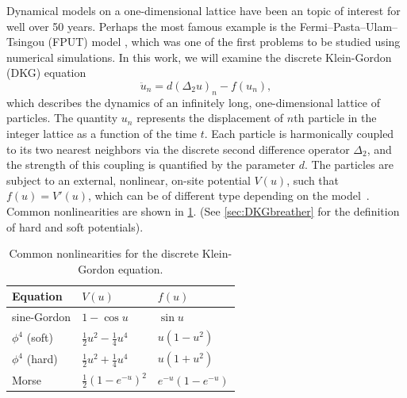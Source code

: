 \documentclass[12pt,reqno]{amsart}
\theoremstyle{definition}
\begin{document}
Dynamical models on a one-dimensional lattice have been an topic of interest for well over 50 years. Perhaps the most famous example is the Fermi–Pasta–Ulam–Tsingou (FPUT) model \cites{FPUT,Zabusuy1965}, which was one of the first problems to be studied using numerical simulations. In this work, we will examine the discrete Klein-Gordon (DKG) equation~\cites{braun2004,SGbook,p4book,kivsharmalomed}
\begin{equation*}
\ddot{u}_n = d (\Delta_2 u)_n - f(u_n),
\end{equation*}
which describes the dynamics of an infinitely long, one-dimensional lattice of particles. The quantity $u_n$ represents the displacement of $n$th particle in the integer lattice as a function of the time $t$. Each particle is harmonically coupled to its two nearest neighbors via the discrete second difference operator $\Delta_2$, and the strength of this coupling is quantified by the parameter $d$. The particles are subject to an external, nonlinear, on-site potential $V(u)$, such that $f(u) = V'(u)$, which can be of different
type depending on the model~\cites{Karachalios,imamat}. Common nonlinearities are shown in \cref{table:V}. (See \cref{sec:DKGbreather} for the definition of hard and soft potentials).

\begin{table}
\begin{tabular}{lll}\toprule
Equation & $V(u)$ & $f(u)$ \\ \midrule
sine-Gordon & $1 - \cos u$ & $\sin u$ \\
$\phi^4$ (soft) & $\frac{1}{2}u^2 - \frac{1}{4}u^4$ & $u(1-u^2)$ \\
$\phi^4$ (hard) & $\frac{1}{2}u^2 + \frac{1}{4}u^4$ & $u(1+u^2)$ \\
Morse & $\frac{1}{2}(1 - e^{-u})^2$ & $e^{-u}(1 - e^{-u})$ \\ \bottomrule
\end{tabular}
\caption{Common nonlinearities for the discrete Klein-Gordon equation.}
\label{table:V}
\end{table}
\end{document}
